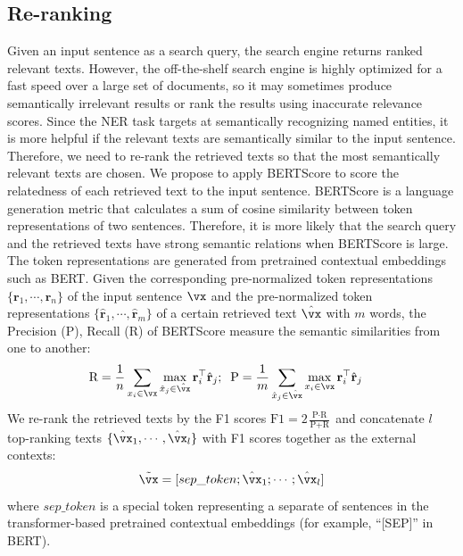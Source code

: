 \documentclass[11pt,a4paper]{article}
\newcommand{\rvec}{\mathbf{r}}
\begin{document}
\subsection{Re-ranking}
Given an input sentence as a search query, the search engine returns ranked relevant texts. %
However, the off-the-shelf search engine is highly optimized for a fast speed over a large set of documents, so it may sometimes produce semantically irrelevant results or rank the results using inaccurate relevance scores.
Since the NER task targets at semantically recognizing named entities, it is more helpful if the relevant texts are semantically similar to the input sentence. Therefore, we need to re-rank the retrieved texts so that the most semantically relevant texts are chosen. We propose to apply BERTScore \citep{Zhang*2020BERTScore:} to score the relatedness of each retrieved text to the input sentence. BERTScore is a language generation metric that calculates a sum of cosine similarity between token representations of two sentences. Therefore, it is more likely that the search query and the retrieved texts have strong semantic relations when BERTScore is large. The token representations are generated from pretrained contextual embeddings such as BERT. Given the corresponding pre-normalized token representations $\{\rvec_1, \cdots, \rvec_n\}$ of the input sentence $\vx$ and the pre-normalized token representations $\{\hat{\rvec}_1, \cdots, \hat{\rvec}_m\}$ of a certain retrieved text $\hat{\vx}$ with $m$ words, the Precision (P), Recall (R) of BERTScore measure the semantic similarities from one to another:
\begin{align*} %
    &\text{R} =\frac{1}{n} \sum_{x_i \in \vx}   \max_{\hat{x}_j \in \hat{\vx}} \rvec_i^\top \hat{\rvec}_{j};\;\;
    \text{P} = \frac{1}{m}  \sum_{\hat{x}_j\in \hat{\vx}}   \max_{x_i\in \vx}  \rvec_{i}^\top \hat{\rvec}_{j}
\end{align*}
 We re-rank the retrieved texts by the F1 scores $\text{F1}{=} 2\frac{\text{P} \cdot \text{R} }{\text{P} + \text{R} }$ and concatenate $l$ top-ranking texts $\{\hat{\vx}_1, \cdots, \hat{\vx}_l\}$ with F1 scores together as the external contexts:
\begin{displaymath}
\tilde{\vx} = [sep\_token; \hat{\vx}_1; \cdots; \hat{\vx}_l]
\end{displaymath} 
where $sep\_token$ is a special token representing a separate of sentences in the transformer-based pretrained contextual embeddings (for example, ``[SEP]'' in BERT).
\end{document}
